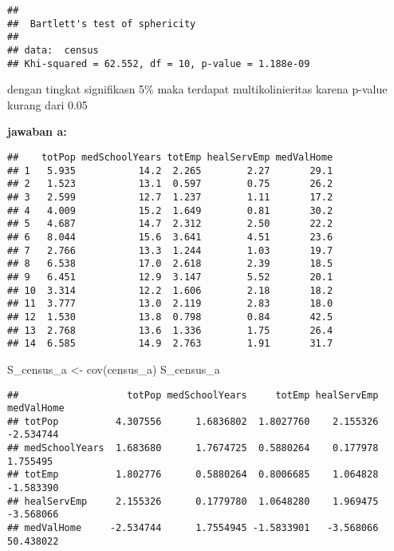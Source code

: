 \documentclass[
]{article}
\newenvironment{Shaded}{\begin{snugshade}}{\end{snugshade}}
\newcommand{\DecValTok}[1]{\textcolor[rgb]{0.00,0.00,0.81}{#1}}
\newcommand{\FunctionTok}[1]{\textcolor[rgb]{0.00,0.00,0.00}{#1}}
\newcommand{\NormalTok}[1]{#1}
\newcommand{\OtherTok}[1]{\textcolor[rgb]{0.56,0.35,0.01}{#1}}
\newcommand{\SpecialCharTok}[1]{\textcolor[rgb]{0.00,0.00,0.00}{#1}}
\begin{document}
\begin{verbatim}
## 
##  Bartlett's test of sphericity
## 
## data:  census
## Khi-squared = 62.552, df = 10, p-value = 1.188e-09
\end{verbatim}

dengan tingkat signifikasn 5\% maka terdapat multikolinieritas karena
p-value kurang dari 0.05

\textbf{jawaban a:}

\begin{Shaded}
\end{Shaded}

\begin{verbatim}
##    totPop medSchoolYears totEmp healServEmp medValHome
## 1   5.935           14.2  2.265        2.27       29.1
## 2   1.523           13.1  0.597        0.75       26.2
## 3   2.599           12.7  1.237        1.11       17.2
## 4   4.009           15.2  1.649        0.81       30.2
## 5   4.687           14.7  2.312        2.50       22.2
## 6   8.044           15.6  3.641        4.51       23.6
## 7   2.766           13.3  1.244        1.03       19.7
## 8   6.538           17.0  2.618        2.39       18.5
## 9   6.451           12.9  3.147        5.52       20.1
## 10  3.314           12.2  1.606        2.18       18.2
## 11  3.777           13.0  2.119        2.83       18.0
## 12  1.530           13.8  0.798        0.84       42.5
## 13  2.768           13.6  1.336        1.75       26.4
## 14  6.585           14.9  2.763        1.91       31.7
\end{verbatim}

\begin{Shaded}
\begin{Highlighting}[]
\NormalTok{S\_census\_a }\OtherTok{\textless{}{-}} \FunctionTok{cov}\NormalTok{(census\_a)}
\NormalTok{S\_census\_a}
\end{Highlighting}
\end{Shaded}

\begin{verbatim}
##                   totPop medSchoolYears     totEmp healServEmp medValHome
## totPop          4.307556      1.6836802  1.8027760    2.155326  -2.534744
## medSchoolYears  1.683680      1.7674725  0.5880264    0.177978   1.755495
## totEmp          1.802776      0.5880264  0.8006685    1.064828  -1.583390
## healServEmp     2.155326      0.1779780  1.0648280    1.969475  -3.568066
## medValHome     -2.534744      1.7554945 -1.5833901   -3.568066  50.438022
\end{verbatim}
\end{document}
